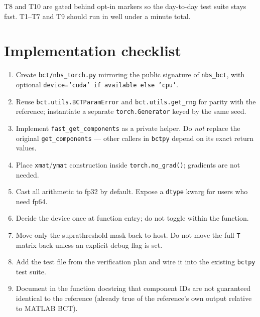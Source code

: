 \documentclass[11pt]{article}
\begin{document}
T8 and T10 are gated behind opt-in markers so the day-to-day test suite stays fast. T1--T7 and T9 should run in well under a minute total.

\section{Implementation checklist}

\begin{enumerate}[leftmargin=2.0em]
\item Create \texttt{bct/nbs\_torch.py} mirroring the public signature of \texttt{nbs\_bct}, with optional \texttt{device='cuda' if available else 'cpu'}.
\item Reuse \texttt{bct.utils.BCTParamError} and \texttt{bct.utils.get\_rng} for parity with the reference; instantiate a separate \texttt{torch.Generator} keyed by the same seed.
\item Implement \texttt{fast\_get\_components} as a private helper. Do \emph{not} replace the original \texttt{get\_components} --- other callers in \texttt{bctpy} depend on its exact return values.
\item Place \texttt{xmat}/\texttt{ymat} construction inside \texttt{torch.no\_grad()}; gradients are not needed.
\item Cast all arithmetic to fp32 by default. Expose a \texttt{dtype} kwarg for users who need fp64.
\item Decide the device once at function entry; do not toggle within the function.
\item Move only the suprathreshold mask back to host. Do not move the full \texttt{T} matrix back unless an explicit debug flag is set.
\item Add the test file from the verification plan and wire it into the existing \texttt{bctpy} test suite.
\item Document in the function docstring that component IDs are not guaranteed identical to the reference (already true of the reference's own output relative to MATLAB BCT).
\end{enumerate}
\end{document}
